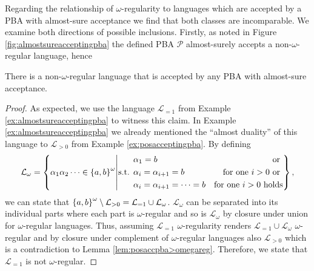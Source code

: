 Regarding the relationship of $\omega$-regularity to languages which are 
accepted by a \ac{PBA} with almost-sure acceptance we find that both classes
are incomparable. We examine both directions of possible inclusions. Firstly,
as noted in Figure \ref{fig:almostsureacceptingpba} the defined \ac{PBA} 
$\mathcal{P}$ almost-surely accepts a non-$\omega$-regular language, hence
\begin{lemma}
  There is a non-$\omega$-regular language that is accepted by any \ac{PBA} 
  with almost-sure acceptance.
  \label{lem:pbanotomegareg}
\end{lemma}
\begin{proof}
  As expected, we use the language $\mathcal{L}_{=1}$ from Example 
  \ref{ex:almostsureacceptingpba} to witness this claim. In Example 
  \ref{ex:almostsureacceptingpba} we already mentioned the 
  \enquote{almost duality} of this language to $\mathcal{L}_{>0}$ from Example
  \ref{ex:posacceptingpba}. By defining
  \begin{equation*}
    \mathcal{L}_{\omega} = \left\{
      \alpha_{1}\alpha_{2}\dots\in\left\{a,b\right\}^{\omega}\middle|
      \text{s.t. }
      \begin{aligned}
        &\alpha_{1} = b&\text{or }\\
        &\alpha_{i} = \alpha_{i+1} = b&\text{for one }i>0\text{ or }\\
        &\alpha_{i} = \alpha_{i+1} = \dots = b&\text{for one }i>0\text{ holds}
      \end{aligned}
    \right\},
  \end{equation*}
  we can state that $\left\{a,b\right\}^{\omega}\setminus\mathcal{L}_{>0} = 
    \mathcal{L}_{=1}\cup\mathcal{L}_{\omega}$.  $\mathcal{L}_{\omega}$ can be 
  separated into its individual parts where each part is $\omega$-regular and 
  so is $\mathcal{L}_{\omega}$ by closure under union for $\omega$-regular 
  languages. Thus, assuming $\mathcal{L}_{=1}$ $\omega$-regularity renders 
  $\mathcal{L}_{=1}\cup\mathcal{L}_{\omega}$ $\omega$-regular and by closure 
  under complement of $\omega$-regular languages also $\mathcal{L}_{>0}$ 
  which is a contradiction to Lemma \ref{lem:posaccpba>omegareg}. Therefore, 
  we state that $\mathcal{L}_{=1}$ is not $\omega$-regular.
\end{proof}

